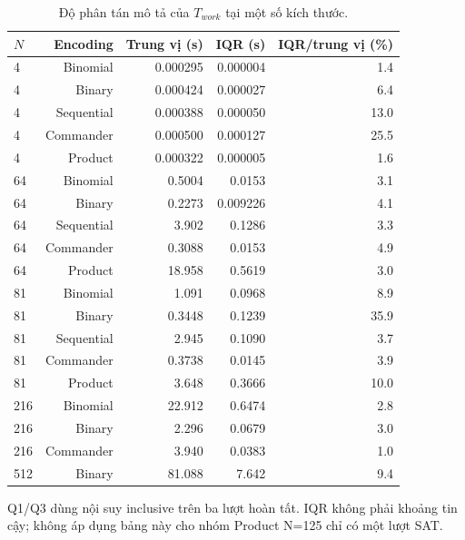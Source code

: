 \begin{table}[pos=H]
\centering
\footnotesize
\caption{Độ phân tán mô tả của $T_{work}$ tại một số kích thước.}
\label{tab:dispersion}
\setlength{\tabcolsep}{4pt}
\begin{tabular}{@{}lrrrr@{}}
\toprule
$N$ & Encoding & Trung vị (s) & IQR (s) & IQR/trung vị (\%) \\
\midrule
4 & Binomial & 0.000295 & 0.000004 & 1.4 \\
4 & Binary & 0.000424 & 0.000027 & 6.4 \\
4 & Sequential & 0.000388 & 0.000050 & 13.0 \\
4 & Commander & 0.000500 & 0.000127 & 25.5 \\
4 & Product & 0.000322 & 0.000005 & 1.6 \\
64 & Binomial & 0.5004 & 0.0153 & 3.1 \\
64 & Binary & 0.2273 & 0.009226 & 4.1 \\
64 & Sequential & 3.902 & 0.1286 & 3.3 \\
64 & Commander & 0.3088 & 0.0153 & 4.9 \\
64 & Product & 18.958 & 0.5619 & 3.0 \\
81 & Binomial & 1.091 & 0.0968 & 8.9 \\
81 & Binary & 0.3448 & 0.1239 & 35.9 \\
81 & Sequential & 2.945 & 0.1090 & 3.7 \\
81 & Commander & 0.3738 & 0.0145 & 3.9 \\
81 & Product & 3.648 & 0.3666 & 10.0 \\
216 & Binomial & 22.912 & 0.6474 & 2.8 \\
216 & Binary & 2.296 & 0.0679 & 3.0 \\
216 & Commander & 3.940 & 0.0383 & 1.0 \\
512 & Binary & 81.088 & 7.642 & 9.4 \\
\bottomrule
\end{tabular}
\par\smallskip\begin{minipage}{\linewidth}\footnotesize Q1/Q3 dùng nội suy inclusive trên ba lượt hoàn tất. IQR không phải khoảng tin cậy; không áp dụng bảng này cho nhóm Product N=125 chỉ có một lượt SAT.\end{minipage}
\end{table}
